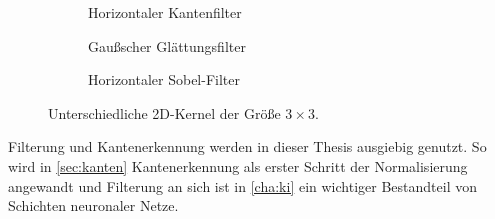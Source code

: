 \begin{figure}
    \centering
    \begin{subfigure}{0.3\textwidth}
        \centering
        \caption{Horizontaler Kantenfilter}
        \label{fig:kantenfilter}
    \end{subfigure}
    \hfill
    \begin{subfigure}{0.3\textwidth}
        \centering
        \caption{Gaußscher Glättungsfilter}
        \label{fig:glättungsfilter}
    \end{subfigure}
    \hfill
    \begin{subfigure}{0.3\textwidth}
        \centering
        \caption{Horizontaler Sobel-Filter}
        \label{fig:sobel}
    \end{subfigure}
    \caption{Unterschiedliche 2D-Kernel der Größe $3 \times 3$.}
    \label{fig:filter}
\end{figure}

Filterung und Kantenerkennung werden in dieser Thesis ausgiebig genutzt. So wird in \autoref{sec:kanten} Kantenerkennung als erster Schritt der Normalisierung angewandt und Filterung an sich ist in \autoref{cha:ki} ein wichtiger Bestandteil von Schichten neuronaler Netze.


